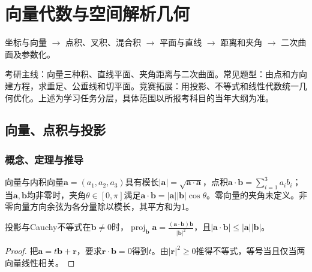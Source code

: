 \chapter{向量代数与空间解析几何}\label{ch:5}
\begin{tcolorbox}[title=章首知识地图,colframe=Ink]
坐标与向量 $\to$ 点积、叉积、混合积 $\to$ 平面与直线 $\to$ 距离和夹角 $\to$ 二次曲面及参数化。
\end{tcolorbox}
\begin{examtip}考研主线：向量三种积、直线平面、夹角距离与二次曲面。常见题型：由点和方向建方程，求垂足、公垂线和切平面。竞赛拓展：用投影、不等式和线性代数统一几何优化。上述为学习任务分层，具体范围以所报考科目的当年大纲为准。\end{examtip}
\section{向量、点积与投影}\label{sec:5:1}

\begin{center}\end{center}

\subsection{概念、定理与推导}

\begin{definition}{向量与内积}向量$\bm a=(a_1,a_2,a_3)$具有模长$|\bm a|=\sqrt{\bm a\cdot\bm a}$，点积$\bm a\cdot\bm b=\sum_{i=1}^3a_ib_i$；当$\bm a,\bm b$均非零时，夹角$\theta\in[0,\pi]$满足$\bm a\cdot\bm b=|\bm a||\bm b|\cos\theta$。零向量的夹角未定义。非零向量方向余弦为各分量除以模长，其平方和为1。\end{definition}
\begin{theorem}{投影与Cauchy不等式}在$\bm b\ne0$时，$\operatorname{proj}_{\bm b}\bm a=\frac{(\bm a\cdot\bm b)\bm b}{|\bm b|^2}$，且$|\bm a\cdot\bm b|\le|\bm a||\bm b|$。\end{theorem}
\begin{proof}把$\bm a=t\bm b+\bm r$，要求$\bm r\cdot\bm b=0$得到$t$。由$|\bm r|^2\ge0$推得不等式，等号当且仅当两向量线性相关。\end{proof}

